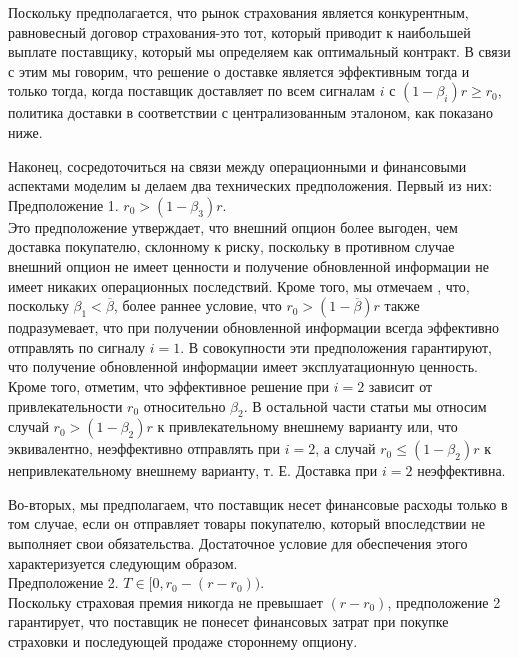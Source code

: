 \documentclass[a4paper,12pt]{article}
\begin{document}
Поскольку предполагается, что рынок страхования является конкурентным, равновесный договор страхования-это тот, который приводит к наибольшей выплате поставщику, который мы определяем как оптимальный контракт. В связи с этим мы говорим, что решение о доставке является эффективным тогда и только тогда, когда поставщик доставляет по всем сигналам $i$ с $(1 - \beta_{i})r \geq r_{0}$, политика доставки в соответствии с централизованным эталоном, как показано ниже.

Наконец, сосредоточиться на связи между операционными и финансовыми аспектами моделим ы делаем два технических предположения. Первый из них:
\\

 Предположение 1. $r_{0} > (1 - \beta_{3})r$.
\\

Это предположение утверждает, что внешний опцион более выгоден, чем доставка покупателю, склонному к риску, поскольку в противном случае внешний опцион не имеет ценности и получение обновленной информации не имеет никаких операционных последствий. Кроме того, мы отмечаем , что, поскольку $\beta_{1} < \overline{\beta}$, более раннее условие, что $r_{0} > (1 - \overline{\beta})r$ также подразумевает, что при получении обновленной информации всегда эффективно отправлять по сигналу $i = 1$. В совокупности эти предположения гарантируют, что получение обновленной информации имеет эксплуатационную ценность. Кроме того, отметим, что эффективное решение при $i = 2$ зависит от привлекательности $r_{0}$ относительно $\beta_{2}$. В остальной части статьи мы относим случай $r_{0} > (1 - \beta_{2})r$ к привлекательному внешнему варианту или, что эквивалентно, неэффективно отправлять при $i = 2$, а случай $r_{0} \leq (1 - \beta_{2})r$ к непривлекательному внешнему варианту, т. Е. Доставка при $i = 2$ неэффективна.


Во-вторых, мы предполагаем, что поставщик несет финансовые расходы только в том случае, если он отправляет товары покупателю, который впоследствии не выполняет свои обязательства. Достаточное условие для обеспечения этого характеризуется следующим образом.
\\

Предположение 2. $T \in [0, r_{0} - (r - r_{0}))$.
\\

Поскольку страховая премия никогда не превышает $(r - r_{0})$, предположение 2 гарантирует, что поставщик
не понесет финансовых затрат при покупке страховки и последующей продаже стороннему опциону.
\end{document}
